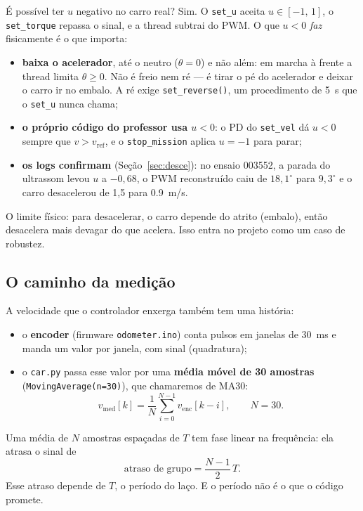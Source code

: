 \documentclass[11pt,a4paper,oneside,openany]{book}
\newcommand{\code}[1]{\texttt{#1}}
\newcommand{\vmed}{v_{\text{med}}}
\begin{document}
\begin{caixa}{É possível ter $u$ negativo no carro real?}
Sim. O \code{set\_u} aceita $u \in [-1,\,1]$, o \code{set\_torque} repassa o sinal, e a
thread subtrai do PWM. O que $u<0$ \emph{faz} fisicamente é o que importa:
\begin{itemize}\itemsep0pt
  \item \textbf{baixa o acelerador}, até o neutro ($\theta = 0$) e não além: em marcha
    à frente a thread limita $\theta \ge 0$. Não é freio nem ré --- é tirar o pé do
    acelerador e deixar o carro ir no embalo. A ré exige \code{set\_reverse()}, um
    procedimento de \SI{5}{s} que o \code{set\_u} nunca chama;
  \item \textbf{o próprio código do professor usa $u<0$}: o PD do \code{set\_vel} dá
    $u<0$ sempre que $v > v_{\text{ref}}$, e o \code{stop\_mission} aplica
    $u = -1$ para parar;
  \item \textbf{os logs confirmam} (Seção~\ref{sec:desce}): no ensaio 003552, a parada
    do ultrassom levou $u$ a $-0{,}68$, o PWM reconstruído caiu de $18{,}1^\circ$ para
    $9{,}3^\circ$ e o carro desacelerou de 1,5 para \SI{0,9}{m/s}.
\end{itemize}
O limite físico: para desacelerar, o carro depende do atrito (embalo), então desacelera
mais devagar do que acelera. Isso entra no projeto como um caso de robustez.
\end{caixa}

\subsection{O caminho da medição}

A velocidade que o controlador enxerga também tem uma história:
\begin{itemize}\itemsep0pt
  \item o \textbf{encoder} (firmware \code{odometer.ino}) conta pulsos em janelas de
    \SI{30}{ms} e manda um valor por janela, com sinal (quadratura);
  \item o \code{car.py} passa esse valor por uma \textbf{média móvel de 30 amostras}
    (\code{MovingAverage(n=30)}), que chamaremos de MA30:
  \begin{equation}
    \vmed[k] = \frac{1}{N}\sum_{i=0}^{N-1} v_{\text{enc}}[k-i], \qquad N = 30.
  \end{equation}
\end{itemize}

Uma média de $N$ amostras espaçadas de $T$ tem fase linear na frequência: ela atrasa o
sinal de
\begin{equation}
  \text{atraso de grupo} = \frac{N-1}{2}\,T.
  \label{eq:atraso-ma}
\end{equation}
Esse atraso depende de $T$, o período do laço. E o período não é o que o código promete.
\end{document}
